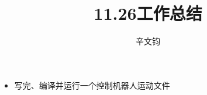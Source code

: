 \documentclass[a4paper]{article}
\title{11.26工作总结}
\author{辛文钧}
\begin{document}
	\begin{itemize}
		\item 写完、编译并运行一个控制机器人运动文件
	\end{itemize}
\end{document}

